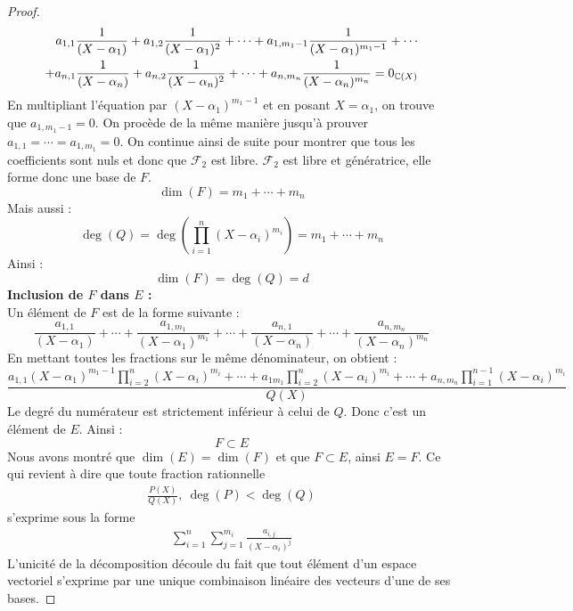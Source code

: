 \begin{proof}
\begin{align*}
        \begin{split}
            a_{1,1} \frac{1}{(X - \alpha_1)} + a_{1,2} \frac{1}{(X - \alpha_1)^2} + \cdots + a_{1,m_1 - 1} \frac{1}{(X - \alpha_1)^{m_1 - 1}} + \cdots \\
            + a_{n,1} \frac{1}{(X - \alpha_n)} + a_{n,2} \frac{1}{(X - \alpha_n)^2} + \cdots + a_{n,m_n} \frac{1}{(X - \alpha_n)^{m_n}} = 0_{\mathbb{C}(X)}
        \end{split}
    \end{align*}
    En multipliant l'équation par $(X - \alpha_1)^{m_1 - 1}$ et en posant $X = \alpha_1$, on trouve que $a_{1,m_1 - 1} = 0$. On procède de la même manière jusqu'à prouver $a_{1,1} = \cdots = a_{1,m_1} = 0$.
    On continue ainsi de suite pour montrer que tous les coefficients sont nuls et donc que $\mathcal{F}_2$ est libre. $\mathcal{F}_2$ est libre et génératrice, elle forme donc une base de $F$.
    \[ \dim(F) = m_1 + \cdots + m_n \]
    Mais aussi : 
    \[ \deg(Q) = \deg \left( \prod_{i=1}^{n} (X - \alpha_i)^{m_i} \right) = m_1 + \cdots + m_n \]
    Ainsi : \[ \dim(F) = \deg(Q) = d \]
    \textbf{Inclusion de $F$ dans $E$ :}
    \\
    Un élément de $F$ est de la forme suivante : 
    \[ \frac{a_{1,1}}{(X - \alpha_1)} + \cdots + \frac{a_{1,m_1}}{(X - \alpha_1)^{m_1}} + \cdots + \frac{a_{n,1}}{(X - \alpha_n)} + \cdots + \frac{a_{n,m_n}}{(X - \alpha_n)^{m_n}} \]
    En mettant toutes les fractions sur le même dénominateur, on obtient :
    \[ \frac{a_{1,1}(X - \alpha_1)^{m_1 - 1} \prod_{i = 2}^{n}(X - \alpha_i)^{m_i} + \cdots + a_{1m_1} \prod_{i = 2}^{n}(X - \alpha_i)^{m_i} + \cdots + a_{n,m_n} \prod_{i = 1}^{n - 1}(X - \alpha_i)^{m_i}}{Q(X)} \]
    Le degré du numérateur est strictement inférieur à celui de $Q$. Donc c'est un élément de $E$. Ainsi :
    \[ F \subset E \]
    Nous avons montré que $\dim(E) = \dim(F)$ et que $F \subset E$, ainsi $E = F$.
    Ce qui revient à dire que toute fraction rationnelle 
    \begin{align*}
        \frac{P(X)}{Q(X)},\ \deg(P) < \deg(Q)
    \end{align*}
    s'exprime sous la forme 
    \begin{align*}
        \sum_{i=1}^n \sum_{j = 1}^{m_i} \frac{a_{i,j}}{(X - \alpha_i)^j}
    \end{align*}
    L'unicité de la décomposition découle du fait que tout élément d'un espace vectoriel s'exprime par une unique combinaison linéaire des vecteurs d'une de ses bases.
\end{proof}